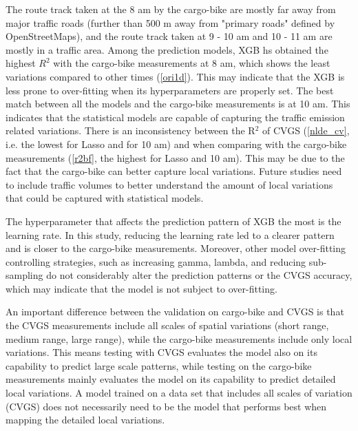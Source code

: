 \documentclass{article}
\begin{document}
The route track taken at the 8 am by the cargo-bike are mostly far away from major traffic roads (further than 500 m away from "primary roads" defined by OpenStreetMaps), and the route track taken at 9 - 10 am and 10 - 11 am are mostly in a traffic area. Among the prediction models, XGB hs obtained the highest $R^2$ with the cargo-bike measurements at 8 am, which shows the least variations compared to other times (\cref{ori1d}). This may indicate that the XGB is less prone to over-fitting when its hyperparameters are properly set. The best match between all the models and the cargo-bike measurements is at 10 am. This indicates that the statistical models are capable of capturing the traffic emission related variations. There is an inconsistency between the R$^2$ of CVGS (\cref{nlde_cv}, i.e. the lowest for Lasso and for 10 am) and when comparing with the cargo-bike measurements (\cref{r2bf}, the highest for Lasso and 10 am). This may be due to the fact that the cargo-bike can better capture local variations. Future studies need to include traffic volumes to better understand the amount of local variations that could be captured with statistical models. 

The hyperparameter that affects the prediction pattern of XGB the most is the learning rate. In this study, reducing the learning rate led to a clearer pattern and is closer to the cargo-bike measurements. Moreover, other model over-fitting controlling strategies, such as increasing gamma, lambda, and reducing sub-sampling do not considerably alter the prediction patterns or the CVGS accuracy, which may indicate that the model is not subject to over-fitting.  


An important difference between the validation on cargo-bike and CVGS is that the CVGS measurements include all scales of spatial variations (short range, medium range, large range), while the cargo-bike measurements include only local variations. This means testing with CVGS evaluates the model also on its capability to predict large scale patterns, while testing on the cargo-bike measurements mainly evaluates the model on its capability to predict detailed local variations. A model trained on a data set that includes all scales of variation (CVGS) does not necessarily need to be the model that performs best when mapping the detailed local variations.
\end{document}
